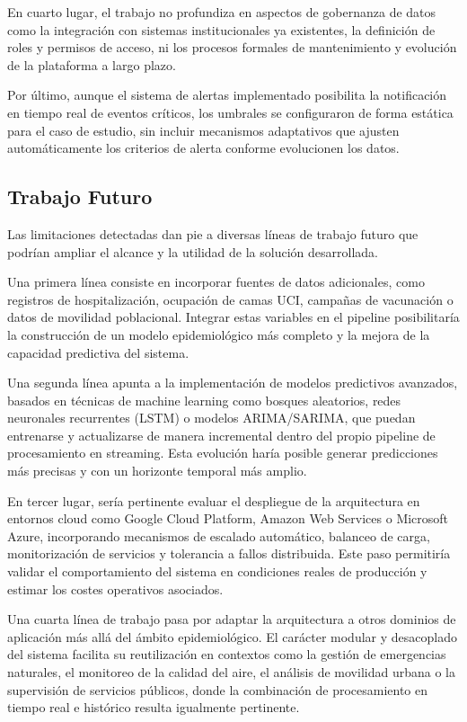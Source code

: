 \documentclass[12pt,a4paper]{article}
\begin{document}
En cuarto lugar, el trabajo no profundiza en aspectos de gobernanza de datos como la integración con sistemas institucionales ya existentes, la definición de roles y permisos de acceso, ni los procesos formales de mantenimiento y evolución de la plataforma a largo plazo.

Por último, aunque el sistema de alertas implementado posibilita la notificación en tiempo real de eventos críticos, los umbrales se configuraron de forma estática para el caso de estudio, sin incluir mecanismos adaptativos que ajusten automáticamente los criterios de alerta conforme evolucionen los datos.

\subsection{Trabajo Futuro}\label{trabajo-futuro}

Las limitaciones detectadas dan pie a diversas líneas de trabajo futuro que podrían ampliar el alcance y la utilidad de la solución desarrollada.

Una primera línea consiste en incorporar fuentes de datos adicionales, como registros de hospitalización, ocupación de camas UCI, campañas de vacunación o datos de movilidad poblacional. Integrar estas variables en el pipeline posibilitaría la construcción de un modelo epidemiológico más completo y la mejora de la capacidad predictiva del sistema.

Una segunda línea apunta a la implementación de modelos predictivos avanzados, basados en técnicas de machine learning como bosques aleatorios, redes neuronales recurrentes (LSTM) o modelos ARIMA/SARIMA, que puedan entrenarse y actualizarse de manera incremental dentro del propio pipeline de procesamiento en streaming. Esta evolución haría posible generar predicciones más precisas y con un horizonte temporal más amplio.

En tercer lugar, sería pertinente evaluar el despliegue de la arquitectura en entornos cloud como Google Cloud Platform, Amazon Web Services o Microsoft Azure, incorporando mecanismos de escalado automático, balanceo de carga, monitorización de servicios y tolerancia a fallos distribuida. Este paso permitiría validar el comportamiento del sistema en condiciones reales de producción y estimar los costes operativos asociados.

Una cuarta línea de trabajo pasa por adaptar la arquitectura a otros dominios de aplicación más allá del ámbito epidemiológico. El carácter modular y desacoplado del sistema facilita su reutilización en contextos como la gestión de emergencias naturales, el monitoreo de la calidad del aire, el análisis de movilidad urbana o la supervisión de servicios públicos, donde la combinación de procesamiento en tiempo real e histórico resulta igualmente pertinente.
\end{document}
